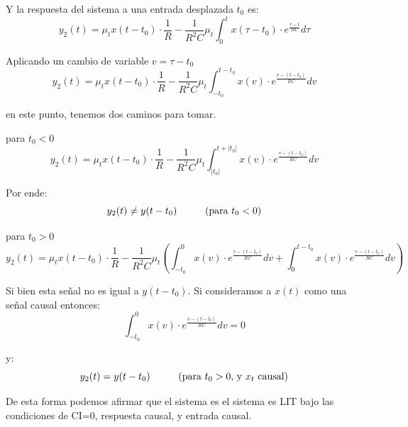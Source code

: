 \documentclass[12pt,a4paper]{report}
\begin{document}
\begin{enumerate}[label=\alph*)]
      Y la respuesta del sistema a una entrada desplazada $t_0$ es:
      $$y_2(t) = \mu_t x(t-t_0) \cdot \frac{1}{R}- \frac{1}{R^2C} \mu_t \int_{0}^{t} x(\tau - t_0) \cdot
      e^{\frac{\tau-t}{RC}} d\tau$$

      Aplicando un cambio de variable $v= \tau-t_0$
      $$y_2(t) = \mu_t x(t-t_0) \cdot \frac{1}{R}- \frac{1}{R^2C} \mu_t \int_{-t_0}^{t-t_0} x(v) \cdot
      e^{\frac{v-(t-t_0)}{RC}} dv$$

      en este punto, tenemos dos caminos para tomar.

      para $t_0 < 0$
      $$y_2(t) = \mu_t x(t-t_0) \cdot \frac{1}{R}- \frac{1}{R^2C} \mu_t \int_{|t_0|}^{t+|t_0|} x(v) \cdot
      e^{\frac{v-(t-t_0)}{RC}} dv$$

      Por ende:
      $$y_2(t) \neq y(t-t_0) \hspace{10mm} (\text{para }t_0<0)$$

      para $t_0 > 0$
      $$y_2(t) = \mu_t x(t-t_0) \cdot \frac{1}{R}- \frac{1}{R^2C} \mu_t \left( \int_{-t_0}^{0} x(v) \cdot 
      e^{\frac{v-(t-t_0)}{RC}} dv +\int_{0}^{t-t_0} x(v) \cdot e^{\frac{v-(t-t_0)}{RC}} dv \right)$$

      Si bien esta señal no es igual a $y(t-t_0)$. Si consideramos a $x(t)$ como una señal causal entonces:
      $$\int_{-t_0}^{0} x(v) \cdot e^{\frac{v-(t-t_0)}{RC}} dv = 0$$

      y:
      $$y_2(t) = y(t-t_0) \hspace{10mm} (\text{para }t_0>0 \text{, y } x_t \text{ causal})$$

      De esta forma podemos afirmar que el sistema es el sistema es LIT bajo las condiciones de CI=0, respuesta causal,
      y entrada causal.



\end{enumerate}
\end{document}

